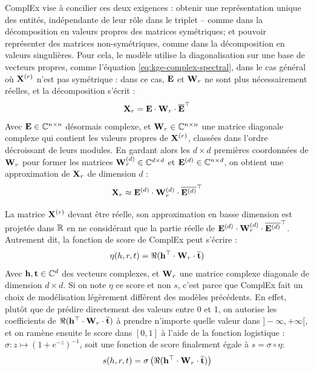 ComplEx vise à concilier ces deux exigences : obtenir une représentation unique des entités, indépendante de leur rôle dans le triplet – comme dans la décomposition en valeurs propres des matrices symétriques; et pouvoir représenter des matrices non-symétriques, comme dans la décomposition en valeurs singulières. Pour cela, le modèle utilise la diagonalisation sur une base de vecteurs propres, comme l'équation \ref{eq:kge-complex-spectral}, dans le cas général où $\bf{X}^{(r)}$ n'est pas symétrique : dans ce cas, $\bf{E}$ et $\bf{W}_r$ ne sont plus nécessairement réelles, et la décomposition s'écrit :
\begin{equation}
    \bf{X}_r = \bf{E} \cdot \bf{W}_r \cdot \compconj{\bf{E}}^\top
    \label{eq:kge-complex-main}
\end{equation}
Avec $\bf{E} \in \mathbb{C}^{n \times n}$ désormais complexe, et $\bf{W}_r \in \mathbb{C}^{n \times n}$ une matrice diagonale complexe qui contient les valeurs propres de $\bf{X}^{(r)}$, classées dans l'ordre décroissant de leurs modules. En gardant alors les $d \times d$ premières coordonnées de $\bf{W}_r$ pour former les matrices $\bf{W}_r^{(d)} \in \mathbb{C}^{d \times d}$ et $\bf{E}^{(d)} \in \mathbb{C}^{n \times d}$, on obtient une approximation de $\bf{X}_r$ de dimension $d$ :
\begin{equation}
    \bf{X}_r \approx \bf{E}^{(d)} \cdot \bf{W}_r^{(d)} \cdot \compconj{ \bf{E}^{(d)}}^\top
\end{equation}

La matrice $\bf{X}^{(r)}$ devant être réelle, son approximation en basse dimension est projetée dans $\R$ en ne considérant que la partie réelle de $\bf{E}^{(d)} \cdot \bf{W}_r^{(d)} \cdot \compconj{ \bf{E}^{(d)}}^\top$. Autrement dit, la fonction de score de ComplEx peut s'écrire :
\begin{equation}
    \eta(h, r, t) = \Re(\bf{h^\top \cdot W}_r \cdot \compconj{\bf{t}})
\end{equation}
Avec $\bf{h, t} \in \mathbb{C}^d$ des vecteurs complexes, et $\bf{W}_r$ une matrice complexe diagonale de dimension $d \times d$. Si on note $\eta$ ce score et non $s$, c'est parce que ComplEx fait un choix de modélisation légèrement différent des modèles précédents. En effet, plutôt que de prédire directement des valeurs entre 0 et 1, on autorise les coefficients de $\Re(\bf{h^\top \cdot W}_r \cdot \compconj{\bf{t}})$ à prendre n'importe quelle valeur dans $] -\infty, +\infty [$, et on ramène ensuite le score dans $[0, 1]$ à l'aide de la fonction logistique : $\sigma : z \mapsto (1 + e^{-z})^{-1}$, soit une fonction de score finalement égale à $s = \sigma \circ \eta$:
\begin{equation}
    s(h, r, t) = \sigma \left( \Re(\bf{h^\top \cdot W}_r \cdot \compconj{\bf{t}}) \right)
\end{equation}

